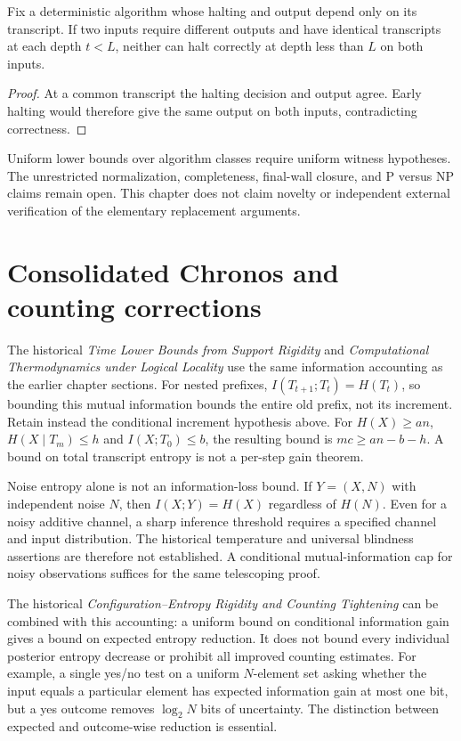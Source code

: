 \begin{theorem}
Fix a deterministic algorithm whose halting and output depend only on its transcript. If two inputs require different outputs and have identical transcripts at each depth $t<L$, neither can halt correctly at depth less than $L$ on both inputs.
\end{theorem}
\begin{proof}
At a common transcript the halting decision and output agree. Early halting would therefore give the same output on both inputs, contradicting correctness.
\end{proof}
Uniform lower bounds over algorithm classes require uniform witness hypotheses. The unrestricted normalization, completeness, final-wall closure, and P versus NP claims remain open. This chapter does not claim novelty or independent external verification of the elementary replacement arguments.

\section{Consolidated Chronos and counting corrections}
The historical \emph{Time Lower Bounds from Support Rigidity} and \emph{Computational Thermodynamics under Logical Locality} use the same information accounting as the earlier chapter sections. For nested prefixes, $I(T_{t+1};T_t)=H(T_t)$, so bounding this mutual information bounds the entire old prefix, not its increment. Retain instead the conditional increment hypothesis above. For $H(X)\ge an$, $H(X\mid T_m)\le h$ and $I(X;T_0)\le b$, the resulting bound is $mc\ge an-b-h$. A bound on total transcript entropy is not a per-step gain theorem.

Noise entropy alone is not an information-loss bound. If $Y=(X,N)$ with independent noise $N$, then $I(X;Y)=H(X)$ regardless of $H(N)$. Even for a noisy additive channel, a sharp inference threshold requires a specified channel and input distribution. The historical temperature and universal blindness assertions are therefore not established. A conditional mutual-information cap for noisy observations suffices for the same telescoping proof.

The historical \emph{Configuration--Entropy Rigidity and Counting Tightening} can be combined with this accounting: a uniform bound on conditional information gain gives a bound on expected entropy reduction. It does not bound every individual posterior entropy decrease or prohibit all improved counting estimates. For example, a single yes/no test on a uniform $N$-element set asking whether the input equals a particular element has expected information gain at most one bit, but a yes outcome removes $\log_2 N$ bits of uncertainty. The distinction between expected and outcome-wise reduction is essential.
